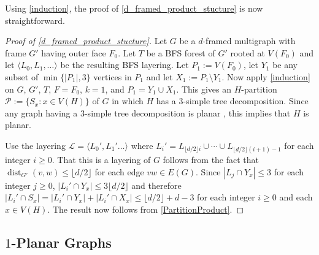 \documentclass{patmorin}
\theoremstyle{plain}
\theoremstyle{definition}
\newcommand{\note}[2]{\noindent{\color{red}[#1:~#2]}}
\DeclareMathOperator{\dist}{dist}
\renewcommand{\ge}{\geqslant}
\renewcommand{\le}{\leqslant}
\begin{document}
Using \cref{induction}, the proof of \cref{d_framed_product_stucture} is now straightforward.


\begin{proof}[Proof of \cref{d_framed_product_stucture}]
	Let $G$ be a $d$-framed multigraph with frame $G'$ having outer face $F_0$.	Let $T$ be a BFS forest of $G'$ rooted at $V(F_0)$ and let $\langle L_0,L_1,\ldots\rangle$ be the resulting BFS layering.  Let $P_1:= V(F_0)$, let $Y_1$ be any subset of $\min\{|P_1|,3\}$ vertices in $P_1$ and let $X_1:=P_1\setminus Y_1$.  Now apply \cref{induction} on $G$, $G'$, $T$, $F=F_0$, $k=1$, and $P_1=Y_1\cup X_1$.
    This gives an $H$-partition $\mathcal{P}:=\{S_x:x\in V(H)\}$ of $G$ in which $H$ has a $3$-simple tree decomposition.  Since any graph having a $3$-simple tree decomposition is planar \cite{knauer.ueckerdt:simple,kratochvil.vaner:note,elmallah.colbourn:on}, this implies that $H$ is planar.

	Use the layering $\mathcal{L}=\langle L_0',L_1'\ldots\rangle$ where $L_i'=L_{\lfloor d/2\rfloor i}\cup \cdots \cup L_{\lfloor d/2\rfloor(i+1)-1}$ for each integer $i\ge 0$. That this is a layering of $G$ follows from the fact that $\dist_{G'}(v,w)\le \lfloor d/2\rfloor$ for each edge $vw\in E(G)$.  Since $|L_j\cap Y_x|\le 3$ for each integer $j\ge 0$, $|L_i'\cap Y_x|\le 3\lfloor d/2\rfloor$ and therefore $|L_i'\cap S_x|= |L_i'\cap Y_x|+ |L_i'\cap X_x|\le \lfloor d/2\rfloor + d -3$ for each integer $i\ge 0$ and each $x\in V(H)$. The result now follows from \cref{PartitionProduct}.
\end{proof}


\subsection{\boldmath $1$-Planar Graphs}
\label{sec-1-planar}
\end{document}
